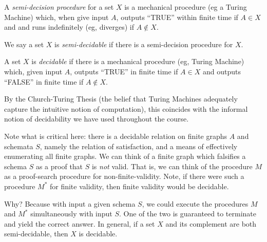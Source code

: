 \begin{definition}
    A \emph{semi-decision procedure} for a set $X$ is a mechanical procedure (eg a Turing Machine) which, when give input $A$, outputs ``TRUE'' within finite time if $A \in X$ and and runs indefinitely (eg, diverges) if $A \not \in X$.
\end{definition}

\begin{definition}\label{sem-dec-def}
    We say a set $X$ is \emph{semi-decidable} if there is a semi-decision procedure for $X$. 
\end{definition}

\begin{definition}
    A set $X$ is \emph{decidable} if there is a mechanical procedure (eg, Turing Machine) which, given input $A$, outputs ``TRUE'' in finite time if $A \in X$ and outputs ``FALSE'' in finite time if $A \not \in X$. 

    By the Church-Turing Thesis (the belief that Turing Machines adequately capture the intuitive notion of computation), this coincides with the informal notion of decidability we have used throughout the course. 
\end{definition}

Note what is critical here: there is a decidable relation on finite graphs $A$ and schemata $S$, namely the relation of satisfaction, and a means of effectively enumerating all finite graphs. We can think of a finite graph which falsifies a schema $S$ as a proof that $S$ is \emph{not} valid. That is, we can think of the procedure $M$ as a proof-search procedure for non-finite-validity. Note, if there were such a procedure $M^*$ for finite validity, then finite validity would be decidable.

\begin{aside}
    Why? Because with input a given schema $S$, we could execute the procedures $M$ and $M^*$ simultaneously with input $S$. One of the two is guaranteed to terminate and yield the correct answer. In general, if a set $X$ and its complement are both semi-decidable, then $X$ is decidable. 
\end{aside}


